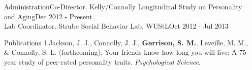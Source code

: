 \documentclass {resume}
\newcommand{\meb}{{\bf Garrison, S. M.}\xspace}
\begin{document}
\begin{samepage}\begin{rSection}{\textrm{Administration}}Co-Director. Kelly/Connolly Longitudinal Study on Personality and Aging\hfill Dec 2012 - Present\smallskip\\
Lab Coordinator. Strube Social Behavior Lab,  WUStL\hfill Oct 2012 - Jul 2013
\end{rSection}\end{samepage}%


\begin{rSection}{\textrm{Publications}}%
1.\hspace* {2.5mm}Jackson, J. J., Connolly, J. J., \meb, Leveille, M. M., \& Connolly, S. L. (forthcoming). Your friends \hspace* {6 mm}know how long you will live: A 75-year study of peer-rated personality traits. \textit{Psychological Science}. \newline\hspace* {6 mm}\href{http://pss.sagepub.com/content/early/2015/01/12/0956797614561800.full}{\color{blue}{doi:10.1177/0956797614561800}}\\
\end{rSection}
\end{document}
